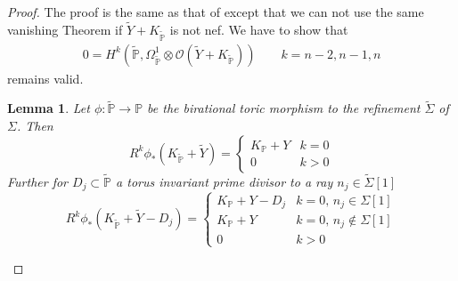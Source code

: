 \documentclass[12pt, english]{article}
\newtheorem{lemma}[definition]{Lemma}
\begin{document}
\begin{proof}
	The proof is the same as that of \cite[Thm. 6.1]{Gie22} except that we can not use the same vanishing Theorem if $\tilde{Y} + K_{\tilde{\mathbb{P}}}$ is not nef. We have to show that
	\begin{align} \label{vanishing_necessary_smooth_bir_models_ker}
		0 = H^{k}(\tilde{\mathbb{P}}, \Omega_{\tilde{\mathbb{P}}}^1 \otimes \mathcal{O}(\tilde{Y} + K_{\tilde{\mathbb{P}}})) \quad \quad k=n-2,n-1,n
	\end{align}
	remains valid.
	
	\begin{lemma} \label{toric_resolution_of_singularities}
		Let $\phi: \tilde{\mathbb{P}} \rightarrow \mathbb{P}$ be the birational toric morphism to the refinement $\tilde{\Sigma}$ of $\Sigma$. Then
		\[ 
		R^k \phi_*(K_{\tilde{\mathbb{P}}} + \tilde{Y}) = \left\{\begin{array}{ll}
			K_{\mathbb{P}} + Y & k=0 \\
			0 & k > 0
		\end{array} \right.
		\]
		Further for $D_j \subset \tilde{\mathbb{P}}$ a torus invariant prime divisor to a ray $n_j \in \tilde{\Sigma}[1]$
		\[ 
		R^k \phi_*(K_{\tilde{\mathbb{P}}} + \tilde{Y} - D_j) = \left\{\begin{array}{ll}
			K_{\mathbb{P}} + Y - D_j & k=0, \, n_j \in \Sigma[1] \\
			K_{\mathbb{P}} + Y & k = 0, \, n_j \notin \Sigma[1] \\
			0 & k > 0
		\end{array} \right.
		\]		
	\end{lemma}
	

\end{proof}
\end{document}
